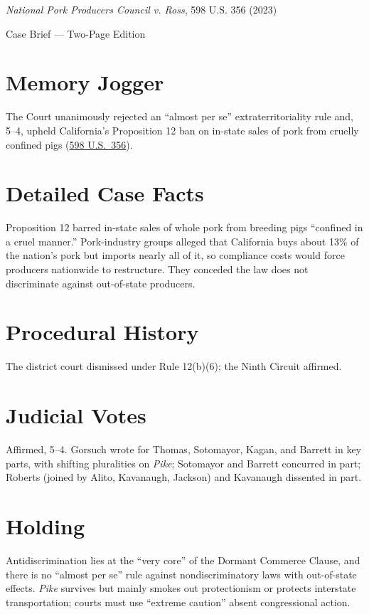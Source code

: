 \documentclass[12pt]{article}
\begin{document}
\begin{center}
{\LARGE \textit{National Pork Producers Council v. Ross}, 598 U.S. 356 (2023)\par}
\vspace{0.5em}
{\large Case Brief --- Two-Page Edition\par}
\end{center}

\section{Memory Jogger}
The Court unanimously rejected an ``almost per se'' extraterritoriality rule and, 5--4, upheld California's Proposition 12 ban on in-state sales of pork from cruelly confined pigs (\href{https://www.law.cornell.edu/supremecourt/text/21-468}{598 U.S.\ 356}).

\section{Detailed Case Facts}
Proposition 12 barred in-state sales of whole pork from breeding pigs ``confined in a cruel manner.'' Pork-industry groups alleged that California buys about 13\% of the nation's pork but imports nearly all of it, so compliance costs would force producers nationwide to restructure. They conceded the law does not discriminate against out-of-state producers.

\section{Procedural History}
The district court dismissed under Rule 12(b)(6); the Ninth Circuit affirmed.

\section{Judicial Votes}
Affirmed, 5--4. Gorsuch wrote for Thomas, Sotomayor, Kagan, and Barrett in key parts, with shifting pluralities on \textit{Pike}; Sotomayor and Barrett concurred in part; Roberts (joined by Alito, Kavanaugh, Jackson) and Kavanaugh dissented in part.

\section{Holding}
Antidiscrimination lies at the ``very core'' of the Dormant Commerce Clause, and there is no ``almost per se'' rule against nondiscriminatory laws with out-of-state effects. \textit{Pike} survives but mainly smokes out protectionism or protects interstate transportation; courts must use ``extreme caution'' absent congressional action.
\end{document}
